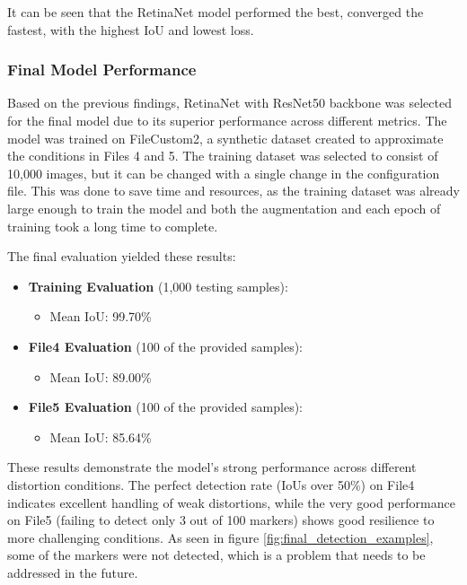 \documentclass[conference]{IEEEtran}
\begin{document}
It can be seen that the RetinaNet model performed the best, converged the fastest, with the highest IoU and lowest loss.

\subsubsection{Final Model Performance}

Based on the previous findings, RetinaNet with ResNet50 backbone was selected for the final model due to its superior performance
across different metrics. The model was trained on FileCustom2, a synthetic dataset created to approximate the conditions
in Files 4 and 5. The training dataset was selected to consist of 10,000 images, but it can be changed with a single change in the configuration file.
This was done to save time and resources, as the training dataset was already large enough to train the model
and both the augmentation and each epoch of training took a long time to complete.

The final evaluation yielded these results:

\begin{itemize}
    \item \textbf{Training Evaluation} (1,000 testing samples):
        \begin{itemize}
            \item Mean IoU: 99.70\%
        \end{itemize}
    \item \textbf{File4 Evaluation} (100 of the provided samples):
        \begin{itemize}
            \item Mean IoU: 89.00\%
        \end{itemize}
    \item \textbf{File5 Evaluation} (100 of the provided samples):
        \begin{itemize}
            \item Mean IoU: 85.64\%
        \end{itemize}
\end{itemize}

These results demonstrate the model's strong performance across different distortion conditions.
The perfect detection rate (IoUs over 50\%) on File4 indicates excellent handling of weak distortions,
while the very good performance on File5 (failing to detect only 3 out of 100 markers) shows good resilience
to more challenging conditions. As seen in figure \ref{fig:final_detection_examples}, some of the markers were not detected, which is a problem that
needs to be addressed in the future.
\end{document}
